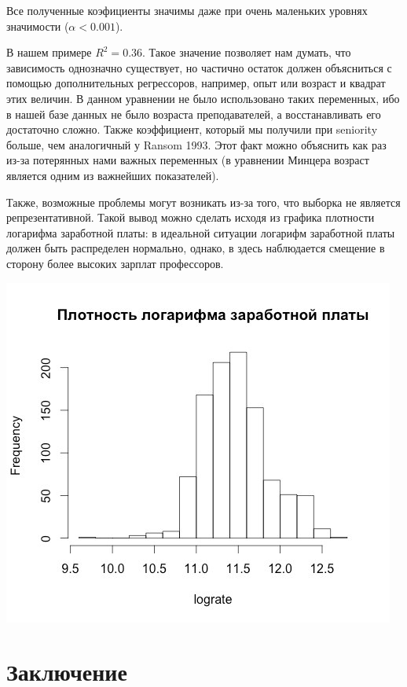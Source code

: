 \documentclass[a4paper, 12pt]{article}
\theoremstyle{definition}
\theoremstyle{plain}
\begin{document}
Все полученные коэфициенты значимы даже при очень маленьких уровнях значимости ($\alpha<0.001$).

В нашем примере $R^2=0.36$. Такое значение позволяет нам думать, что зависимость однозначно существует, но частично остаток должен объясниться с помощью дополнительных регрессоров, например, опыт или возраст и квадрат этих величин. В данном уравнении не было использовано таких переменных, ибо в нашей базе данных не было возраста преподавателей, а восстанавливать его достаточно сложно.
Также коэффициент, который мы получили при seniority больше, чем аналогичный у Ransom 1993. Этот факт можно объяснить как раз из-за потерянных нами важных переменных (в уравнении Минцера возраст является одним из важнейших показателей).

Также, возможные проблемы могут возникать из-за того, что выборка не является репрезентативной. Такой вывод можно сделать исходя из графика плотности логарифма заработной платы: в идеальной ситуации логарифм заработной платы должен быть распределен нормально, однако, в здесь наблюдается смещение в сторону более высоких зарплат профессоров.


\begin{center}
\includegraphics[scale=0.5]{image1}
\end{center}

\section{Заключение}



 
\end{document}
